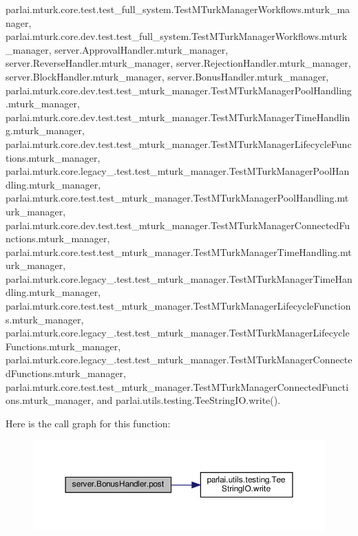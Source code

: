 parlai.\+mturk.\+core.\+test.\+test\+\_\+full\+\_\+system.\+Test\+M\+Turk\+Manager\+Workflows.\+mturk\+\_\+manager, parlai.\+mturk.\+core.\+dev.\+test.\+test\+\_\+full\+\_\+system.\+Test\+M\+Turk\+Manager\+Workflows.\+mturk\+\_\+manager, server.\+Approval\+Handler.\+mturk\+\_\+manager, server.\+Reverse\+Handler.\+mturk\+\_\+manager, server.\+Rejection\+Handler.\+mturk\+\_\+manager, server.\+Block\+Handler.\+mturk\+\_\+manager, server.\+Bonus\+Handler.\+mturk\+\_\+manager, parlai.\+mturk.\+core.\+dev.\+test.\+test\+\_\+mturk\+\_\+manager.\+Test\+M\+Turk\+Manager\+Pool\+Handling.\+mturk\+\_\+manager, parlai.\+mturk.\+core.\+dev.\+test.\+test\+\_\+mturk\+\_\+manager.\+Test\+M\+Turk\+Manager\+Time\+Handling.\+mturk\+\_\+manager, parlai.\+mturk.\+core.\+dev.\+test.\+test\+\_\+mturk\+\_\+manager.\+Test\+M\+Turk\+Manager\+Lifecycle\+Functions.\+mturk\+\_\+manager, parlai.\+mturk.\+core.\+legacy\+\_.\+test.\+test\+\_\+mturk\+\_\+manager.\+Test\+M\+Turk\+Manager\+Pool\+Handling.\+mturk\+\_\+manager, parlai.\+mturk.\+core.\+test.\+test\+\_\+mturk\+\_\+manager.\+Test\+M\+Turk\+Manager\+Pool\+Handling.\+mturk\+\_\+manager, parlai.\+mturk.\+core.\+dev.\+test.\+test\+\_\+mturk\+\_\+manager.\+Test\+M\+Turk\+Manager\+Connected\+Functions.\+mturk\+\_\+manager, parlai.\+mturk.\+core.\+test.\+test\+\_\+mturk\+\_\+manager.\+Test\+M\+Turk\+Manager\+Time\+Handling.\+mturk\+\_\+manager, parlai.\+mturk.\+core.\+legacy\+\_.\+test.\+test\+\_\+mturk\+\_\+manager.\+Test\+M\+Turk\+Manager\+Time\+Handling.\+mturk\+\_\+manager, parlai.\+mturk.\+core.\+test.\+test\+\_\+mturk\+\_\+manager.\+Test\+M\+Turk\+Manager\+Lifecycle\+Functions.\+mturk\+\_\+manager, parlai.\+mturk.\+core.\+legacy\+\_.\+test.\+test\+\_\+mturk\+\_\+manager.\+Test\+M\+Turk\+Manager\+Lifecycle\+Functions.\+mturk\+\_\+manager, parlai.\+mturk.\+core.\+legacy\+\_.\+test.\+test\+\_\+mturk\+\_\+manager.\+Test\+M\+Turk\+Manager\+Connected\+Functions.\+mturk\+\_\+manager, parlai.\+mturk.\+core.\+test.\+test\+\_\+mturk\+\_\+manager.\+Test\+M\+Turk\+Manager\+Connected\+Functions.\+mturk\+\_\+manager, and parlai.\+utils.\+testing.\+Tee\+String\+I\+O.\+write().

Here is the call graph for this function\+:
\nopagebreak
\begin{figure}[H]
\begin{center}
\leavevmode
\includegraphics[width=350pt]{classserver_1_1BonusHandler_a8bd13dda76f95db6e56f29d5a2e0a472_cgraph}
\end{center}
\end{figure}


